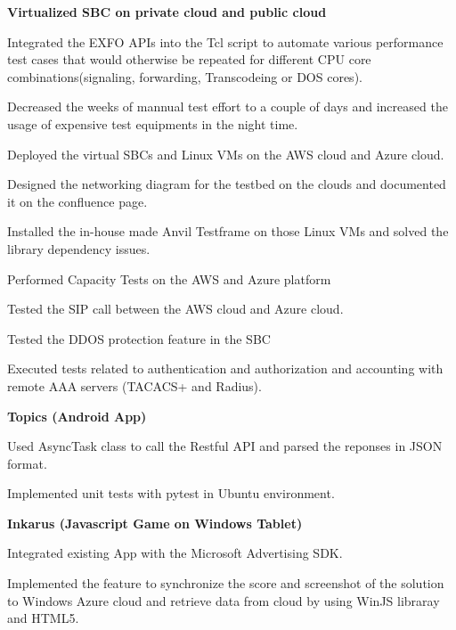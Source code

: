 \documentclass[a4paper]{lyu-resume} %
\begin{document}
\begin{minipage}[t]{0.66\textwidth}
\vspace{\topsep} %
\textbf{Virtualized SBC on private cloud and public cloud}
\begin{tightitemize}
\item Integrated the EXFO APIs into the Tcl script to automate various performance test cases that would otherwise be repeated for different CPU core combinations(signaling, forwarding, Transcodeing or DOS cores).
\item Decreased the weeks of mannual test effort to a couple of days and increased the usage of expensive test equipments in the night time.
\item Deployed the virtual SBCs and Linux VMs on the AWS cloud and Azure cloud. 
\item Designed the networking diagram for the testbed on the clouds and documented it on the confluence page.
\item Installed the in-house made Anvil Testframe on those Linux VMs and solved the library dependency issues.
\item Performed Capacity Tests on the AWS and Azure platform 
\item Tested the SIP call between the AWS cloud and Azure cloud.
\item Tested the DDOS protection feature in the SBC
\item Executed tests related to authentication and authorization and accounting with remote AAA servers (TACACS+ and Radius).
\end{tightitemize}

\sectionspace %

\textbf{Topics (Android App)}
\begin{tightitemize}
\item Used AsyncTask class to call the Restful API and parsed the reponses in JSON format.
\item Implemented unit tests with pytest in Ubuntu environment.
\end{tightitemize}

\vspace{2 mm}
\textbf{Inkarus (Javascript Game on Windows Tablet)}
\begin{tightitemize}
\item Integrated existing App with the Microsoft Advertising SDK.
\item Implemented the feature to synchronize the score and screenshot of the solution to Windows Azure cloud and retrieve data from cloud by using WinJS libraray and HTML5.
\end{tightitemize}


\end{minipage}
\end{document}
